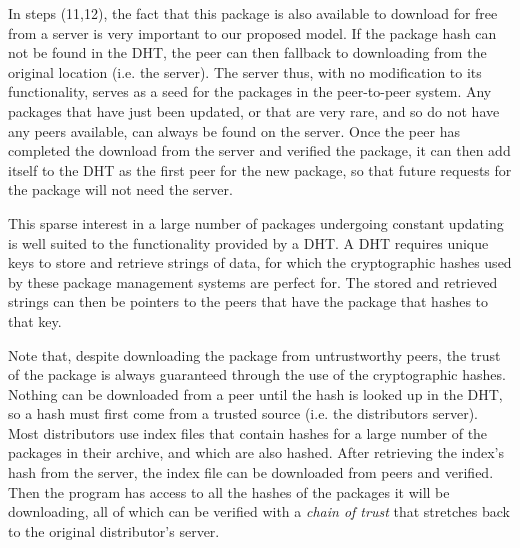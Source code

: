 \documentclass[conference]{IEEEtran}
\begin{document}
In steps (11,12), the fact that this package is also available to download for free
from a server is very important to our proposed model. If the package hash
can not be found in the DHT, the peer can then fallback to
downloading from the original location (i.e. the server).
The server thus, with no modification to its
functionality, serves as a seed for the packages in the peer-to-peer
system. Any packages that have just been updated, or that are very
rare, and so do not have any peers available, can always be found on
the server. Once the peer has completed the download from the server
and verified the package, it can then add itself to the DHT as the
first peer for the new package, so that future requests for the package
will not need the server.

This sparse
interest in a large number of packages undergoing constant updating
is well suited to the functionality provided by a DHT. A DHT requires unique keys to store and retrieve strings
of data, for which the cryptographic hashes used by these package
management systems are perfect for. The stored and retrieved strings
can then be pointers to the peers that have the package that hashes
to that key.

Note that, despite downloading the package from untrustworthy peers,
the trust of the package is always guaranteed through the use
of the cryptographic hashes. Nothing can be downloaded from a peer
until the hash is looked up in the DHT, so a hash must first come
from a trusted source (i.e. the distributors server). Most distributors use index
files that contain hashes for a large number of the packages in
their archive, and which are also hashed. After retrieving the
index's hash from the server, the index file can be downloaded from
peers and verified. Then the program has access to all the hashes of
the packages it will be downloading, all of which can be verified
with a \emph{chain of trust} that stretches back to the original
distributor's server.
\end{document}
